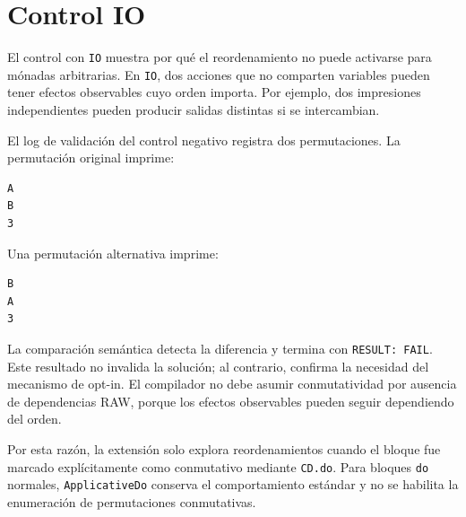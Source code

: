 
\section{Control IO}

El control con \texttt{IO} muestra por qué el reordenamiento no puede activarse para mónadas arbitrarias. En \texttt{IO}, dos acciones que no comparten variables pueden tener efectos observables cuyo orden importa. Por ejemplo, dos impresiones independientes pueden producir salidas distintas si se intercambian.

El log de validación del control negativo registra dos permutaciones. La permutación original imprime:

\begin{verbatim}
A
B
3
\end{verbatim}

Una permutación alternativa imprime:

\begin{verbatim}
B
A
3
\end{verbatim}

La comparación semántica detecta la diferencia y termina con \texttt{RESULT: FAIL}. Este resultado no invalida la solución; al contrario, confirma la necesidad del mecanismo de opt-in. El compilador no debe asumir conmutatividad por ausencia de dependencias RAW, porque los efectos observables pueden seguir dependiendo del orden.

Por esta razón, la extensión solo explora reordenamientos cuando el bloque fue marcado explícitamente como conmutativo mediante \texttt{CD.do}. Para bloques \texttt{do} normales, \texttt{ApplicativeDo} conserva el comportamiento estándar y no se habilita la enumeración de permutaciones conmutativas.
